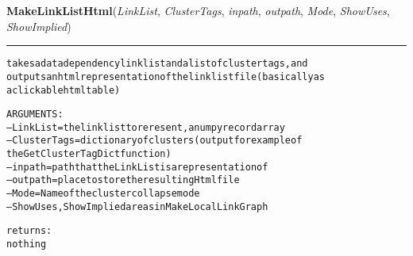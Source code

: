     \label{System:SystemGraphOperations:MakeLinkListHtml}

    \vspace{0.5ex}

\hspace{.8\funcindent}\begin{boxedminipage}{\funcwidth}

    \raggedright \textbf{MakeLinkListHtml}(\textit{LinkList}, \textit{ClusterTags}, \textit{inpath}, \textit{outpath}, \textit{Mode}, \textit{ShowUses}, \textit{ShowImplied})

    \vspace{-1.5ex}

    \rule{\textwidth}{0.5\fboxrule}
\setlength{\parskip}{2ex}
\begin{alltt}

takes a data dependency linklist and a list of cluster tags, and 
outputs an html representation of the linklist file (basically as
a clickable html table) 

ARGUMENTS:
--LinkList = the linklist to reresent, a numpy record array
--ClusterTags = dictionary of clusters (output for example of
        the GetClusterTagDict function)
--inpath = path that the LinkList is a representation of
--outpath = place to store the resulting Html file
--Mode = Name of the cluster collapse mode
--ShowUses, ShowImplied are as in MakeLocalLinkGraph
        
returns:
        nothing
                
\end{alltt}

\setlength{\parskip}{1ex}
    \end{boxedminipage}

    \label{System:SystemGraphOperations:LabeledGraphFromLinks}

    \vspace{0.5ex}

